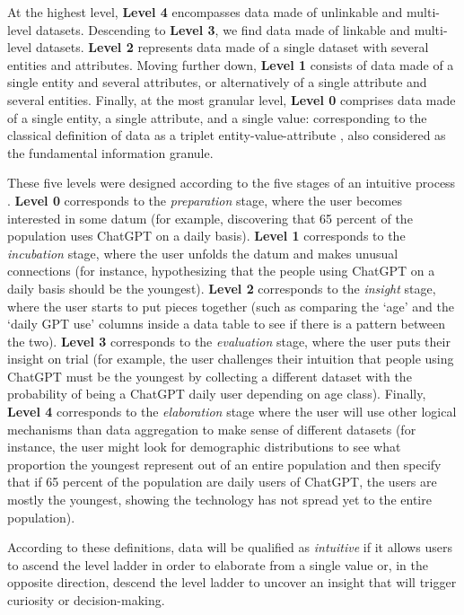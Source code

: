 \documentclass[]{hdsr}
\theoremstyle{plain}      %
\theoremstyle{definition} %
\theoremstyle{remark}     %
\begin{document}
At the highest level, \textbf{Level 4} encompasses data made of unlinkable and multi-level datasets. Descending to \textbf{Level 3}, we find data made of linkable and multi-level datasets. \textbf{Level 2} represents data made of a single dataset with several entities and attributes. Moving further down, \textbf{Level 1} consists of data made of a single entity and several attributes, or alternatively of a single attribute and several entities. Finally, at the most granular level, \textbf{Level 0} comprises data made of a single entity, a single attribute, and a single value: corresponding to the classical definition of data as a triplet entity-value-attribute \citep{redman1997}, also considered as the fundamental information granule.

These five levels were designed according to the five stages of an intuitive process \citep{csikszentmihalyi1997flow}. \textbf{Level 0} corresponds to the \emph{preparation} stage, where the user becomes interested in some datum (for example, discovering that 65 percent of the population uses ChatGPT on a daily basis). \textbf{Level 1} corresponds to the \emph{incubation} stage, where the user unfolds the datum and makes unusual connections (for instance, hypothesizing that the people using ChatGPT on a daily basis should be the youngest). \textbf{Level 2} corresponds to the \emph{insight} stage, where the user starts to put pieces together (such as comparing the `age' and the `daily GPT use' columns inside a data table to see if there is a pattern between the two). \textbf{Level 3} corresponds to the \emph{evaluation} stage, where the user puts their insight on trial (for example, the user challenges their intuition that people using ChatGPT must be the youngest by collecting a different dataset with the probability of being a ChatGPT daily user depending on age class). Finally, \textbf{Level 4} corresponds to the \emph{elaboration} stage where the user will use other logical mechanisms than data aggregation to make sense of different datasets (for instance, the user might look for demographic distributions to see what proportion the youngest represent out of an entire population and then specify that if 65 percent of the population are daily users of ChatGPT, the users are mostly the youngest, showing the technology has not spread yet to the entire population).

According to these definitions, data will be qualified as \emph{intuitive} if it allows users to ascend the level ladder in order to elaborate from a single value or, in the opposite direction, descend the level ladder to uncover an insight that will trigger curiosity or decision-making.
\end{document}
